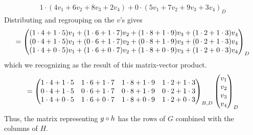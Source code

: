 \begin{example}
\begin{align*}
{               1\cdot(4v_1+6v_2+8v_3+2v_4)+0\cdot(5v_1+7v_2+9v_3+3v_4)}_D
\end{align*}
Distributing and regrouping on the $v$'s gives
\begin{equation*}
  =
  \begin{pmatrix} (1\cdot4+1\cdot5)v_1+
                (1\cdot6+1\cdot7)v_2+
                (1\cdot8+1\cdot9)v_3+
                (1\cdot2+1\cdot3)v_4 \\
                (0\cdot4+1\cdot5)v_1+
                (0\cdot6+1\cdot7)v_2+
                (0\cdot8+1\cdot9)v_3+
                (0\cdot2+1\cdot3)v_4 \\
                (1\cdot4+0\cdot5)v_1+
                (1\cdot6+0\cdot7)v_2+
                (1\cdot8+0\cdot9)v_3+
                (1\cdot2+0\cdot3)v_4 \end{pmatrix}_D
\end{equation*}
which we recognizing as the result of this matrix-vector product.
\begin{equation*}
  =
  \begin{pmatrix}
    1\cdot4+1\cdot5  &1\cdot6+1\cdot7  &1\cdot8+1\cdot9  &1\cdot2+1\cdot3 \\
    0\cdot4+1\cdot5  &0\cdot6+1\cdot7  &0\cdot8+1\cdot9  &0\cdot2+1\cdot3 \\
    1\cdot4+0\cdot5  &1\cdot6+0\cdot7  &1\cdot8+0\cdot9  &1\cdot2+0\cdot3
  \end{pmatrix}_{B,D}
  \begin{pmatrix} v_1 \\ v_2 \\ v_3 \\ v_4 \end{pmatrix}_D
\end{equation*}
Thus,
the matrix representing $g\mathbin\circ h$ has the rows of $G$
combined with the columns of $H$.
\end{example}

